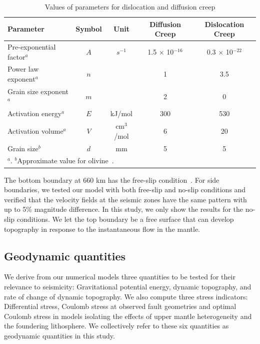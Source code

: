 \documentclass[draft,linenumbers]{agujournal2018}
\begin{document}
\begin{table}[ht] 
    \caption{Values of parameters for dislocation and diffusion creep}
    \centering
    \begin{tabular}{l c c c c}
    \hline
     Parameter  & Symbol & Unit & Diffusion Creep & Dislocation Creep  \\
    \hline
      Pre-exponential factor$^a$ & $A$ & $s^{-1}$ & 1.5 $\times$ 10$^{-16}$ & 0.3 $\times$ 10$^{-22}$   \\
      Power law exponent$^a$ & $n$ & & 1 & 3.5  \\
      Grain size exponent$^a$  & $m$ & & 2 & 0   \\
      Activation energy$^a$  & $E$ & kJ/mol & 300 & 530   \\
      Activation volume$^a$  & $V$ & cm$^3$/mol & 6 & 20 \\
      Grain size$^b$         & $d$ & mm & 5 & 5 \\
    \hline
    \multicolumn{5}{l}{$^{a}$\citet{karato1993rheology}. $^b$Approximate value for olivine~\citep{karato1984grain}.}
    \end{tabular}
    \label{table_model}
\end{table}
%
The bottom boundary at 660 km has the free-slip condition~\citep[e.g.,][]{arcay2007slab, billen2007rheologic, quinquis2011role}. For side boundaries, we tested our model with both free-slip and no-slip conditions and verified that the velocity fields at the seismic zones have the same pattern with up to 5\% magnitude difference. In this study, we only show the results for the no-slip conditions. We let the top boundary be a free surface that can develop topography in response to the instantaneous flow in the mantle. 

\subsection{Geodynamic quantities}
We derive from our numerical models three quantities to be tested for their relevance to seismicity: Gravitational potential energy, dynamic topography, and rate of change of dynamic topography. We also compute three stress indicators: Differential stress, Coulomb stress at observed fault geometries and optimal Coulomb stress in models isolating the effects of upper mantle heterogeneity and the foundering lithosphere. We collectively refer to these six quantities as geodynamic quantities in this study.
\end{document}
